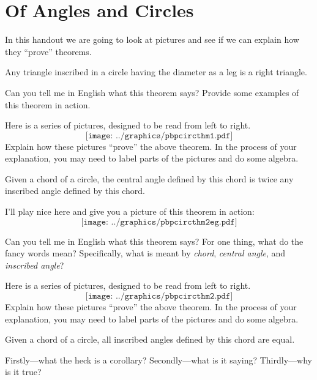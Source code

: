 \newpage
\section{Of Angles and Circles} %

In this handout we are going to look at pictures and see if we can
explain how they ``prove'' theorems.


\begin{theorem} 
Any triangle inscribed in a circle having the diameter as a leg is a
right triangle.
\end{theorem}

\begin{prob}
Can you tell me in English what this theorem says? Provide some
examples of this theorem in action.
\end{prob}

\begin{prob} 
Here is a series of pictures, designed to be read from left to right.
\[
\texttt{[image: ../graphics/pbpcircthm1.pdf]}
\]
Explain how these pictures ``prove'' the above theorem. In the process
of your explanation, you may need to label parts of the pictures and
do some algebra.
\end{prob}


\begin{theorem} 
Given a chord of a circle, the central angle defined by this chord is
twice any inscribed angle defined by this chord.
\end{theorem}

I'll play nice here and give you a picture of this theorem in action:
\[
\texttt{[image: ../graphics/pbpcircthm2eg.pdf]}
\]

\begin{prob}
Can you tell me in English what this theorem says? For one thing, what
do the fancy words mean? Specifically, what is meant by
\textit{chord}, \textit{central angle}, and \textit{inscribed angle}?
\end{prob}

\newpage


\begin{prob} 
Here is a series of pictures, designed to be read from left to right.
\[
\texttt{[image: ../graphics/pbpcircthm2.pdf]}
\]
Explain how these pictures ``prove'' the above theorem. In the process
of your explanation, you may need to label parts of the pictures and
do some algebra.
\end{prob}



\begin{corollary} 
Given a chord of a circle, all inscribed angles defined by this chord
are equal.
\end{corollary}

\begin{prob} 
Firstly---what the heck is a corollary? Secondly---what is it saying?
Thirdly---why is it true?
\end{prob}


